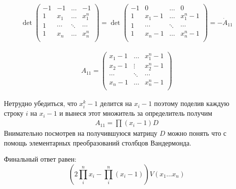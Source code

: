 \begin{sol}
    \begin{gather*}
        \det
        \left(\begin{array}{cccc}
        -1 & -1 & \ldots & -1 \\
        1 & x_{1} & \ldots & x_{1}^n\\
        1 & \cdots & \ddots & \cdots \\
        1 &  x_{n} & \ldots & x_{n}^n\\
        \end{array}\right) =
        \det
        \left(\begin{array}{cccc}
        -1 & 0 & \ldots & 0 \\
        1 & x_{1} - 1 & \ldots & x_{1}^n - 1\\
        1 & \cdots & \ddots & \cdots \\
        1 &  x_{n} - 1 & \ldots & x_{n}^n - 1\\
        \end{array}\right) = - \dot A_{11}
    \end{gather*}
    
    \begin{gather*}
        A_{11} = \left(\begin{array}{ccc}
        x_{1} - 1 & \ldots & x_{1}^n - 1\\
        x_{2} - 1 & \vdots & x_{2}^n - 1 \\
        \cdots    & \ddots & \cdots \\
        x_{n} - 1 & \ldots & x_{n}^n - 1\\
        \end{array}\right)
    \end{gather*}
    
    Нетрудно убедиться, что $x^k_{i} - 1$ делится на $x_{i} - 1$ поэтому поделив каждую строку $i$ на $x_{i} - 1$ и вынеся этот множитель за определитель получим 
    \begin{gather*}
        A_{11} = \prod (x_i - 1) D
    \end{gather*}
    Внимательно посмотрев на получившуюся матрицу $D$ можно понять что с помощь элементарных преобразований столбцов Вандермонда.
    
    Финальный ответ равен:
    $$
        \left( 2 \prod^{n}_{i} x_{i}  - \prod^{n}_{i} (x_i - 1)\right) V(x_1 \ldots x_n) 
    $$
    
\end{sol}